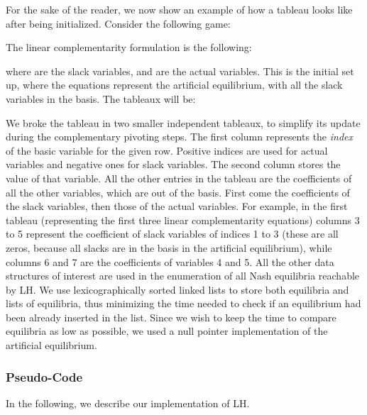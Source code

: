 \documentclass[11pt]{article}
\begin{document}
For the sake of the reader, we now show an example of how a tableau
looks like after being initialized. Consider the following game:




The linear complementarity formulation is the following:



\noindent where  are the slack variables, and  are the actual variables. This is the initial set up,
where the equations represent the artificial equilibrium, with all
the slack variables in the basis. The tableaux will be:




We broke the tableau in two smaller independent tableaux, to
simplify its update during the complementary pivoting steps. The
first column represents the {\it index} of the basic variable for
the given row. Positive indices are used for actual variables and
negative ones for slack variables. The second column stores the
value of that variable. All the other entries in the tableau are the
coefficients of all the other variables, which are out of the basis.
First come the coefficients of the slack variables, then those of
the actual variables. For example, in the first tableau
(representing the first three linear complementarity equations)
columns 3 to 5 represent the coefficient of slack variables of
indices 1 to 3 (these are all zeros, because all slacks are in the
basis in the artificial equilibrium), while columns 6 and 7 are the
coefficients of variables 4 and 5. All the other data structures of
interest are used in the enumeration of all Nash equilibria
reachable by LH. We use lexicographically sorted linked lists to
store both equilibria and lists of equilibria, thus minimizing the
time needed to check if an equilibrium had been already inserted in
the list. Since we wish to keep the time to compare equilibria as
low as possible, we used a null pointer implementation of the
artificial equilibrium.

\subsubsection{Pseudo-Code}

In the following, we describe our implementation of LH.
\end{document}
